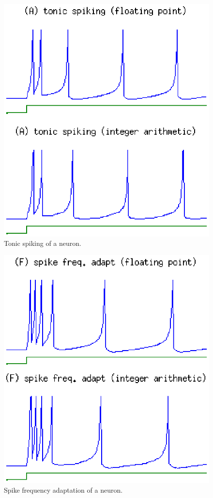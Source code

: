 \documentclass[journal]{./sty/IEEEtran}
\begin{document}
\begin{figure}
\centering
\includegraphics[scale=0.6]{imgs/izh_tonic}
\caption{Tonic spiking of a neuron.\label{fig:tonic}}
\end{figure}

\begin{figure}
\centering
\includegraphics[scale=0.6]{imgs/izh_spike_freq_adapt}
\caption{Spike frequency adaptation of a neuron.\label{fig:freq}}
\end{figure}
\end{document}
